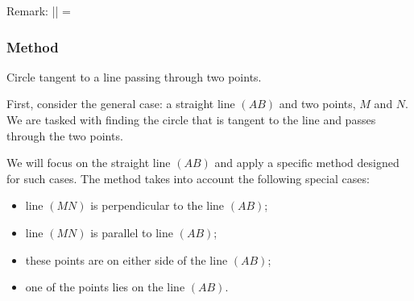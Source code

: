 
\begin{center}
\end{center}


Remark: || = 

\subsubsection{Method } %
\label{ssub:c_l_pp}
Circle tangent to a line passing through two points.

First, consider the general case: a straight line $(AB)$ and two points, $M$ and $N$. We are tasked with finding the circle that is tangent to the line and passes through the two points.

 We will focus on the straight line $(AB)$ and apply a specific method designed for such cases.
The method takes into account the following special cases:

\begin{itemize}
  \item line $(MN)$ is perpendicular to the line $(AB)$;
  \item line $(MN)$ is parallel to line $(AB)$;
  \item these points are on either side of the line $(AB)$;
  \item one of the points lies on the line $(AB)$.
\end{itemize}

\vspace{6pt}

